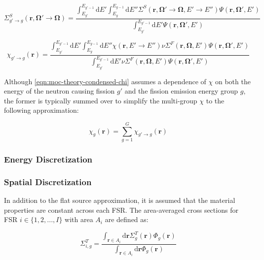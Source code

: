 \begin{equation}
\label{eqn:moc-theory-condensed-scatter-xs}
\Sigma_{g'\rightarrow g}^S(\mathbf{r},\mathbf{\Omega'}\rightarrow \mathbf{\Omega}) = \frac{\int_{E_{g'}}^{E_{g'-1}}\mathrm{d}E'\int_{E_{g}}^{E_{g-1}}\mathrm{d}E''\Sigma^S(\mathbf{r},\mathbf{\Omega'}\rightarrow \mathbf{\Omega},E'\rightarrow E'')\Psi(\mathbf{r},\mathbf{\Omega'},E')}{\int_{E_{g'}}^{E_{g'-1}}\mathrm{d}E'\Psi(\mathbf{r},\mathbf{\Omega'},E')}
\end{equation}

\begin{equation}
\label{eqn:moc-theory-condensed-chi}
\chi_{g'\rightarrow g}(\mathbf{r}) = \frac{\int_{E_{g'}}^{E_{g'-1}}\mathrm{d}E'\int_{E_{g}}^{E_{g-1}}\mathrm{d}E''\chi(\mathbf{r},E'\rightarrow E'')\nu\Sigma^F(\mathbf{r},\mathbf{\Omega},E')\Psi(\mathbf{r},\mathbf{\Omega'},E')}{\int_{E_{g'}}^{E_{g'-1}}\mathrm{d}E'\nu\Sigma^F(\mathbf{r},\mathbf{\Omega},E')\Psi(\mathbf{r},\mathbf{\Omega'},E')}
\end{equation}

Although \autoref{eqn:moc-theory-condensed-chi} assumes a dependence of $\chi$ on both the energy of the neutron causing fission $g'$ and the fission emission energy group $g$, the former is typically summed over to simplify the multi-group $\chi$ to the following approximation:

\begin{equation}
\label{eqn:moc-theory-condensed-chi-group}
\chi_{g}(\mathbf{r}) = \displaystyle\sum\limits_{g=1}^{G}\chi_{g'\rightarrow g}(\mathbf{r})
\end{equation}


\subsubsection{Energy Discretization}
\label{subsubsec:chap2-energy-discrete}

\subsubsection{Spatial Discretization}
\label{subsubsec:chap2-space-discrete}

In addition to the flat source approximation, it is assumed that the material properties are constant across each FSR. The area-averaged cross sections for FSR $i \in \{1, 2, ..., I\}$ with area $A_{i}$ are defined as:

\begin{equation}
\label{eqn:chap2-area-avg-total-xs}
\Sigma_{i,g}^{T} = \frac{\int_{\mathbf{r}\in A_{i}}\mathrm{d}\mathbf{r}\Sigma_{g}^T(\mathbf{r})\Phi_{g}(\mathbf{r})}{\int_{\mathbf{r}\in A_{i}}\mathrm{d}\mathbf{r}\Phi_{g}(\mathbf{r})}
\end{equation}

